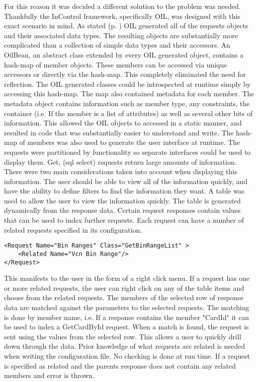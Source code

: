\documentclass[a4paper, 11pt, titlepage]{article}
\begin{document}
For this reason it was decided a different solution to the problem was needed. Thankfully the InControl framework, specifically OIL, was designed with this exact scenario in mind. As stated (p. \pageref{OILIntro}) OIL generated all of the requests objects and their associated data types. The resulting objects are substantially more complicated than a collection of simple data types and their accessors. An OilBean, an abstract class extended by every OIL generated object, contains a hash-map of member objects. These members can be accessed via unique accessors or directly via the hash-map. This completely eliminated the need for reflection. The OIL generated classes could be introspected at runtime simply by accessing this hash-map. The map also contained metadata for each member. \label{metadata} The metadata object contains information such as member type, any constraints, the container (i.e. If the member is a list of attributes) as well as several other bits of information. This allowed the OIL objects to accessed in a static manner, and resulted in code that was substantially easier to understand and write. 
The hash-map of members was also used to generate the user interface at runtime. The requests were partitioned by functionality so separate interfaces could be used to display them. Get, (sql select) requests return large amounts of information. There were two main considerations taken into account when displaying this information. The user should be able to view all of the information quickly, and have the ability to define filters to find the information they want. A table was used to allow the user to view the information quickly. The table is generated dynamically from the response data. Certain request responses contain values that can be used to index further requests. Each request can have a number of related requests specified in its configuration.  
 
\begin{verbatim} 
<Request Name="Bin Ranges" Class="GetBinRangeList" > 
    <Related Name="Vcn Bin Range"/> 
</Request> 
\end{verbatim} 
 
This manifests to the user in the form of a right click menu. If a request has one or more related requests, the user can right click on any of the table items and choose from the related requests. The members of the selected row of response data are matched against the parameters to the selected requests. The matching is done by member name, i.e. If a response contains the member "CardId" it can be used to index a GetCardById request. When a match is found, the request is sent using the values from the selected row. This allows a user to quickly drill down through the data. Prior knowledge of what requests are related is needed when writing the configuration file. No checking is done at run time. If a request is specified as related and the parents response does not contain any related members and error is thrown. 
 
\end{document}
